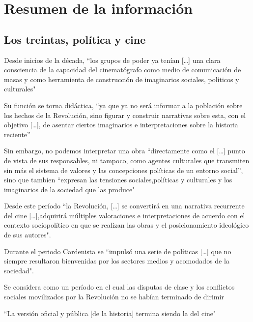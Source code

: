 \section{Resumen de la información}

\subsection{Los treintas, política y cine}
\begin{compactitem}
     \item 
     Desde inicios de la década, ``los grupos de poder ya tenían [\ldots] una clara 
     consciencia de la capacidad del cinematógrafo como medio de comunicación de masas y
     como herramienta de construcción de imaginarios sociales, políticos y culturales"\autocite[108]{piedras_narrativas_2012}
    \item
    Su función se torna didáctica\autocite[439]{monsivais_notas_????}, ``ya que ya no será informar a la población sobre los hechos de la
    Revolución, sino figurar y construir narrativas sobre esta, con el objetivo [\ldots], de asentar ciertos imaginarios e interpretaciones sobre la historia reciente''\autocite[108]{piedras_narrativas_2012}
   \item
   Sin embargo, no podemos interpretar una obra ``directamente como el
   [\ldots] punto de vista de sus responsables, ni tampoco, como agentes culturales que
   transmiten sin más el sistema de valores y las concepciones políticas de un entorno social'', sino que tambíen ``expresan 
   las tensiones sociales,políticas y culturales y los imaginarios de la sociedad que las produce"\autocite[109]{piedras_narrativas_2012}
    \item
    Desde este período ``la Revolución, [\ldots] se convertirá en una narrativa recurrente del cine [\ldots],adquirirá múltiples valoraciones e interpretaciones de acuerdo con el
    contexto sociopolítico en que se realizan las obras y el posicionamiento ideológico de sus
    autores".\autocite[110]{piedras_narrativas_2012}
    \item
    Durante el periodo Cardenista se ``impulsó una serie de políticas [\ldots] que no siempre resultaron
    bienvenidas por los sectores medios y acomodados de la sociedad". \autocite[114]{piedras_narrativas_2012}
    \item
    Se considera como un período en el cual las disputas de clase y los conflictos sociales movilizados por la
Revolución no se habían terminado de dirimir\autocite[112]{piedras_narrativas_2012}
    \item ``La versión oficial y pública [de la historia] termina 
siendo la del cine"\autocite[440]{monsivais_notas_????}
\end{compactitem} 




